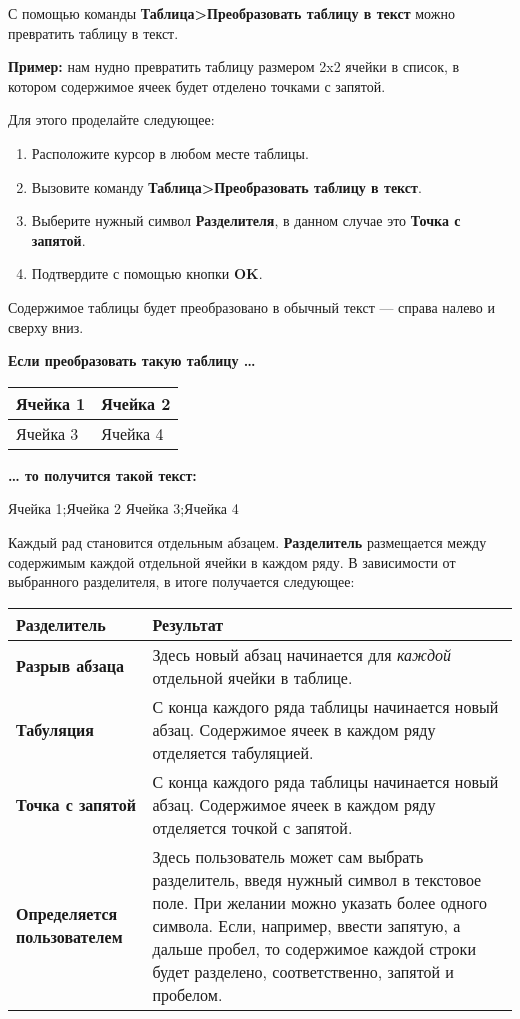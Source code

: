 \documentclass[a4paper,10pt]{article}
\begin{document}
С помощью команды \textbf{Таблица>Преобразовать таблицу в текст} можно превратить таблицу в текст.

\textbf{Пример:} нам нудно превратить таблицу размером 2x2 ячейки в список, в котором содержимое ячеек будет отделено точками с запятой.

Для этого проделайте следующее:

\begin{enumerate}
 \item Расположите курсор в любом месте таблицы.
 \item Вызовите команду \textbf{Таблица>Преобразовать таблицу в текст}.
 \item Выберите нужный символ \textbf{Разделителя}, в данном случае это \textbf{Точка с запятой}.
 \item Подтвердите с помощью кнопки \textbf{OK}.
\end{enumerate}

Содержимое таблицы будет преобразовано в обычный текст --- справа налево и сверху вниз.

\textbf{Если преобразовать такую таблицу …}

\begin{center}
\begin{tabular}{ | m{3cm} | m{3cm} | }
\hline
 Ячейка 1 & Ячейка 2 \\ 
 \hline
 Ячейка 3 & Ячейка 4\\
\hline
\end{tabular}
\end{center}

\textbf{… то получится такой текст:}

Ячейка 1;Ячейка 2
Ячейка 3;Ячейка 4

Каждый рад становится отдельным абзацем. \textbf{Разделитель} размещается между содержимым каждой отдельной ячейки в каждом ряду. В зависимости от выбранного разделителя, в итоге получается следующее:

\begin{center}
\begin{tabular}{  m{3cm}  m{11cm}  }
 \textbf{Разделитель} & \textbf{Результат}\\ 
 \hline
  \textbf{Разрыв абзаца} & Здесь новый абзац начинается для \textit{каждой} отдельной ячейки в таблице.\\
  \hline
  \textbf{Табуляция} & С конца каждого ряда таблицы начинается новый абзац. Содержимое ячеек в каждом ряду отделяется табуляцией.\\
  \hline
\textbf{Точка с запятой} & С конца каждого ряда таблицы начинается новый абзац. Содержимое ячеек в каждом ряду отделяется точкой с запятой.\\
\hline
\textbf{Определяется пользователем} & Здесь пользователь может сам выбрать разделитель, введя нужный символ в текстовое поле. При желании можно указать более одного символа. Если, например, ввести запятую, а дальше пробел, то содержимое каждой строки будет разделено, соответственно, запятой и пробелом.\\
\hline
\end{tabular}
\end{center}
\end{document}
